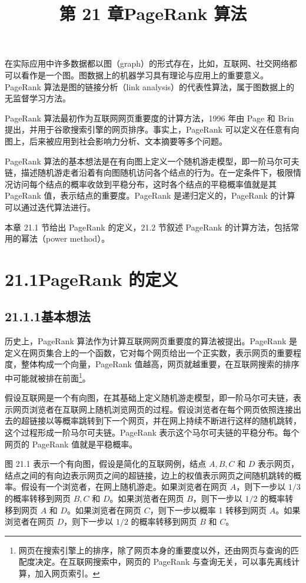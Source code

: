 \documentclass[UTF8, 12pt, fontset=fandol, oneside]{ctexart}
\title{第 21 章\quad PageRank 算法}
\author{}
\date{}
\begin{document}
\maketitle

在实际应用中许多数据都以图（graph）的形式存在，比如，互联网、社交网络都可以看作是一个图。图数据上的机器学习具有理论与应用上的重要意义。PageRank 算法是图的链接分析（link analysis）的代表性算法，属于图数据上的无监督学习方法。

PageRank 算法最初作为互联网网页重要度的计算方法，1996 年由 Page 和 Brin 提出，并用于谷歌搜索引擎的网页排序。事实上，PageRank 可以定义在任意有向图上，后来被应用到社会影响力分析、文本摘要等多个问题。

PageRank 算法的基本想法是在有向图上定义一个随机游走模型，即一阶马尔可夫链，描述随机游走者沿着有向图随机访问各个结点的行为。在一定条件下，极限情况访问每个结点的概率收敛到平稳分布，这时各个结点的平稳概率值就是其 PageRank 值，表示结点的重要度。PageRank 是递归定义的，PageRank 的计算可以通过迭代算法进行。

本章 21.1 节给出 PageRank 的定义，21.2 节叙述 PageRank 的计算方法，包括常用的幂法（power method）。

\section*{21.1\quad PageRank 的定义}

\subsection*{21.1.1\quad 基本想法}

历史上，PageRank 算法作为计算互联网网页重要度的算法被提出。PageRank 是定义在网页集合上的一个函数，它对每个网页给出一个正实数，表示网页的重要程度，整体构成一个向量，PageRank 值越高，网页就越重要，在互联网搜索的排序中可能就被排在前面\footnote{网页在搜索引擎上的排序，除了网页本身的重要度以外，还由网页与查询的匹配度决定。在互联网搜索中，网页的 PageRank 与查询无关，可以事先离线计算，加入网页索引。}。

假设互联网是一个有向图，在其基础上定义随机游走模型，即一阶马尔可夫链，表示网页浏览者在互联网上随机浏览网页的过程。假设浏览者在每个网页依照连接出去的超链接以等概率跳转到下一个网页，并在网上持续不断进行这样的随机跳转，这个过程形成一阶马尔可夫链。PageRank 表示这个马尔可夫链的平稳分布。每个网页的 PageRank 值就是平稳概率。

图 21.1 表示一个有向图，假设是简化的互联网例，结点 $A,B,C$ 和 $D$ 表示网页，结点之间的有向边表示网页之间的超链接，边上的权值表示网页之间随机跳转的概率。假设有一个浏览者，在网上随机游走。如果浏览者在网页 $A$，则下一步以 $1/3$ 的概率转移到网页 $B,C$ 和 $D$。如果浏览者在网页 $B$，则下一步以 $1/2$ 的概率转移到网页 $A$ 和 $D$。如果浏览者在网页 $C$，则下一步以概率 1 转移到网页 $A$。如果浏览者在网页 $D$，则下一步以 $1/2$ 的概率转移到网页 $B$ 和 $C$。
\end{document}

